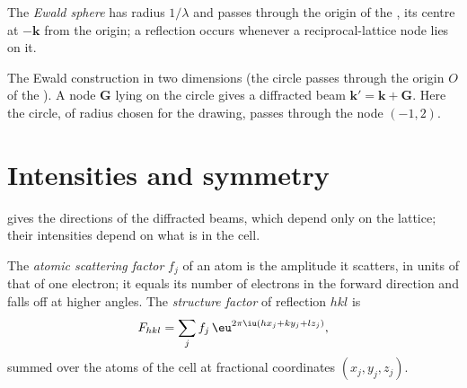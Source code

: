 \begin{definition}\label{def:b3:x-ray-diffraction:ewald}
The \emph{Ewald sphere} has radius $1/\lambda$ and passes through
the origin of the , its centre at $-\mathbf k$ from the origin; a
reflection occurs whenever a reciprocal-lattice node lies on it.
\end{definition}

\begin{omfigure}

{\small The Ewald construction in two dimensions (the circle passes through the
origin $O$ of the ). A node $\mathbf G$ lying on the circle gives a
diffracted beam $\mathbf k' = \mathbf k + \mathbf G$. Here the circle, of radius chosen for the
drawing, passes through the node $(-1, 2)$.}
\end{omfigure}

\section{Intensities and symmetry}

 gives the directions of the diffracted beams, which depend only on
the lattice; their intensities depend on what is in the cell.

\begin{definition}\label{def:b3:x-ray-diffraction:structure-factor}
The \emph{atomic scattering factor} $f_j$ of an
atom is the amplitude it scatters, in units of that of one electron; it equals
its number of electrons in the forward direction and falls off at higher
angles. The \emph{structure factor} of reflection $hkl$ is
\[
F_{hkl} = \sum_jf_j\,\eu^{2\pi\iu(hx_j + ky_j + lz_j)},
\]
summed over the atoms of the cell at fractional coordinates $(x_j, y_j, z_j)$.
\end{definition}

